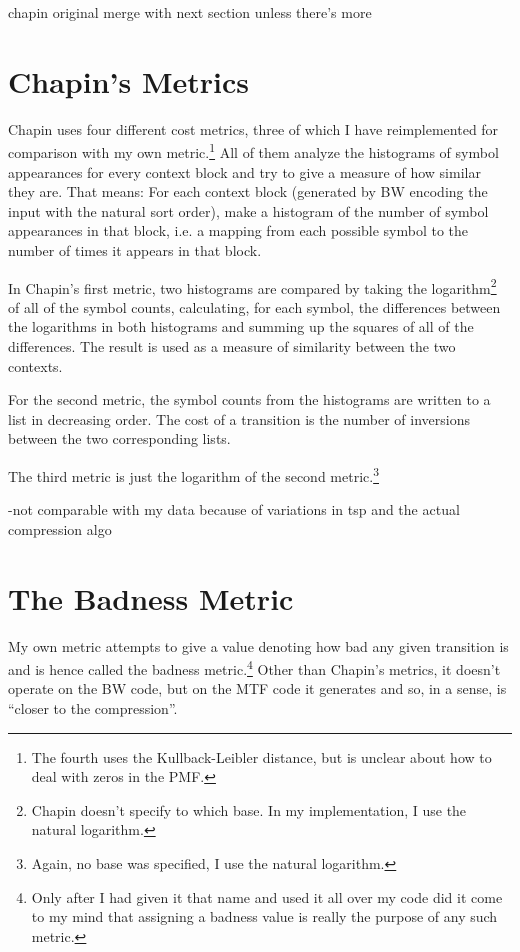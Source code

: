 \documentclass[a4paper]{scrreprt}
\begin{document}
chapin original \cite{chapin1998sort,chapin2001diss}
merge with next section unless there's more

\section{Chapin's Metrics}


Chapin uses four different cost metrics, three of which I have reimplemented for
comparison with my own metric.\footnote{The fourth uses the Kullback-Leibler
distance, but is unclear about how to deal with zeros in the PMF.} All of them
analyze the histograms of symbol appearances for every context block and try to
give a measure of how similar they are. That means: For each context block
(generated by BW encoding the input with the natural sort order), make a
histogram of the number of symbol appearances in that block, i.e.
a mapping from each possible symbol to the number of times it appears in that
block.

In Chapin's first metric, two histograms are compared by taking the
logarithm\footnote{Chapin doesn't specify to which base. In my implementation,
I use the natural logarithm.} of all of the symbol counts, calculating, for each
symbol, the differences between the logarithms in both histograms and summing up
the squares of all of the differences. The result is used as a measure of
similarity between the two contexts.

For the second metric, the symbol counts from the histograms are written to a
list in decreasing order. The cost of a transition is the number of
inversions\cite{sleator1985amortized} between the two corresponding lists.

The third metric is just the logarithm of the second metric.\footnote{Again, no
base was specified, I use the natural logarithm.}

-not comparable with my data because of variations in tsp and the actual
compression algo

\section{The Badness Metric}

My own metric attempts to give a value denoting how bad any given transition is
and is hence called the badness metric.\footnote{Only after I had given it that
name and used it all over my code did it come to my mind that assigning a
badness value is really the purpose of any such metric.} Other than Chapin's
metrics, it doesn't operate on the BW code, but on the MTF code it generates
and so, in a sense, is ``closer to the compression''.
\end{document}
